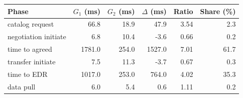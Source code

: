 \begin{tabular}{lrrrrr}
    \toprule
    Phase & $G_1$ (ms) & $G_2$ (ms) & $\Delta$ (ms) & Ratio & Share (\%) \\
    \midrule
    catalog request & 66.8 & 18.9 & 47.9 & 3.54 & 2.3 \\
    negotiation initiate & 6.8 & 10.4 & -3.6 & 0.66 & 0.2 \\
    time to agreed & 1781.0 & 254.0 & 1527.0 & 7.01 & 61.7 \\
    transfer initiate & 7.5 & 11.3 & -3.7 & 0.67 & 0.3 \\
    time to EDR & 1017.0 & 253.0 & 764.0 & 4.02 & 35.3 \\
    data pull & 6.0 & 5.4 & 0.6 & 1.11 & 0.2 \\
    \bottomrule
\end{tabular}
